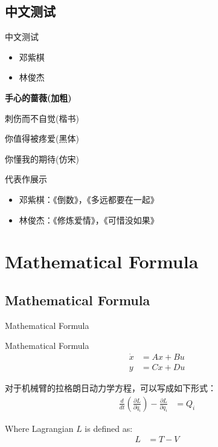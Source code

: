 \documentclass[xcolor=x11names,compress,aspectratio=169]{ctexbeamer}
\begin{document}
\subsection{中文测试}
\begin{frame}{中文测试}
\vspace{-2cm}
\hspace{3cm}
\begin{itemize}
  \item 邓紫棋
  \item 林俊杰
\end{itemize}

\begin{center}
  \textbf{手心的蔷薇(加粗)}

  \selectfont \kaishu 刺伤而不自觉(楷书)
  
  \selectfont \heiti 你值得被疼爱(黑体)
  
  \selectfont \fangsong 你懂我的期待(仿宋)
\end{center}

\begin{block}{代表作展示}
  \begin{itemize}
    \item 邓紫棋：《倒数》，《多远都要在一起》
    \item 林俊杰：《修炼爱情》，《可惜没如果》
  \end{itemize}
\end{block}

\end{frame}  

\section{Mathematical Formula}
\subsection{Mathematical Formula}
\begin{frame}{Mathematical Formula}
\begin{block}{Mathematical Formula}
  \begin{equation}
    \begin{aligned}
      \dot{x} &= Ax + Bu \\
      y &= Cx + Du
    \end{aligned}
  \end{equation}
\end{block}

对于机械臂的拉格朗日动力学方程，可以写成如下形式：
\begin{equation}
  \begin{aligned}
    \frac{d}{dt}(\frac{\partial L}{\partial \dot{q}_i}) - \frac{\partial L}{\partial q_i} &= Q_i
  \end{aligned}
\end{equation}

Where Lagrangian $L$ is defined as:
\begin{equation}
  \begin{aligned}
    L &= T - V
  \end{aligned}
\end{equation}
\end{frame}
\end{document}
